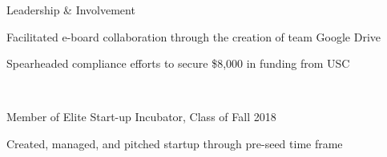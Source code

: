 \documentclass{resume} %
\begin{document}
\begin{rSection}{Leadership \& Involvement}

\company{\uscih}{\la}
\begin{rList}
\item Facilitated e-board collaboration through the creation of team Google Drive
\item Spearheaded compliance efforts to secure \$8,000 in funding from USC
\end{rList}
 \\
\vspace{0.5em}


\company{\lavalab}{\la}
\begin{rList}
\item Member of Elite Start-up Incubator, Class of Fall 2018
\item Created, managed, and pitched startup through pre-seed time frame
\end{rList}

\end{rSection}

\end{document}
